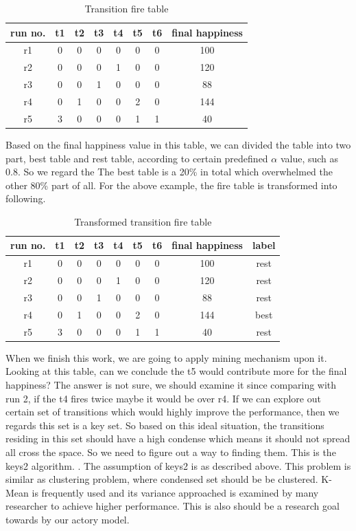 \documentclass{sig-alternate}
\begin{document}
 \begin{table}[h]
\centering
\caption{Transition fire table }
\begin{tabular}{|c|c|c|c|c|c|c|c|}\hline
run no.& t1 & t2 & t3 & t4 & t5 &t6 &final happiness \\
\hline
r1&0&0&0&0&0&0& 100\\
\hline
r2&0&0&0&1&0&0& 120\\
\hline
r3&0&0&1&0&0&0& 88\\
\hline
r4&0&1&0&0&2&0& 144\\
\hline
r5&3&0&0&0&1&1& 40\\
\hline
\end{tabular}
\end{table}

Based on the final happiness value in this table, we can divided the table into two part, best table and rest table, according to certain predefined $\alpha$ value, such as 0.8. So we regard the The best table is a 20\% in total which overwhelmed the other 80\% part of all.  For the above example, the fire table is transformed into following.
 \begin{table}[h]
\centering
\caption{Transformed transition fire table }
\begin{tabular}{|c|c|c|c|c|c|c|c|c|}\hline
run no.&t1 & t2 & t3 & t4 & t5 &t6 &final happiness &label\\
\hline
r1&0&0&0&0&0&0& 100&rest\\
\hline
r2&0&0&0&1&0&0& 120&rest\\
\hline
r3&0&0&1&0&0&0& 88& rest\\
\hline
r4&0&1&0&0&2&0& 144&best\\
\hline
r5&3&0&0&0&1&1& 40&rest\\
\hline
\end{tabular}
\end{table}

When we finish this work, we are going to apply mining mechanism upon it.  Looking at this table, can we conclude the t5 would contribute more for the final happiness? The answer is not sure, we should examine it since comparing with run 2, if the t4 fires twice maybe it would be over r4.  If we can explore out certain set of transitions which would highly improve the performance, then we regards this set is a key set.  So based on this ideal situation, the transitions residing in this set should have a high condense which means it should not spread all cross the space.  So we need to figure out a way to finding them.  This is the keys2 algorithm. \cite{gay09keys}.  The assumption of keys2 is as described above. This problem is similar as clustering problem, where condensed set should be be clustered. K-Mean \cite{kmean} is frequently used and its variance approached is examined by many researcher to achieve higher performance.  This is also should be a research goal towards by our actory model. \\
\end{document}
